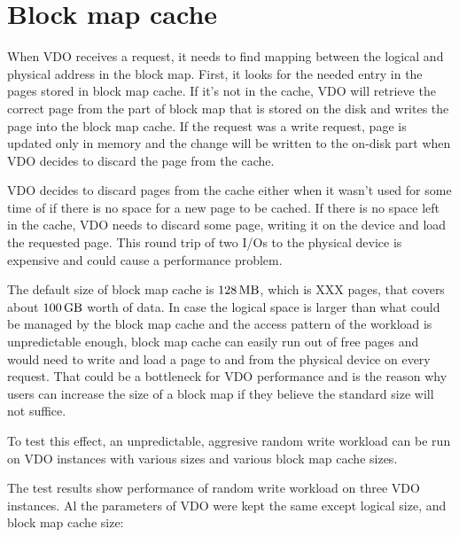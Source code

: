 \documentclass[
  color, %
  table, %
  lof,   %
  lot,   %
]{fithesis3}
\begin{document}
\section{Block map cache}

When VDO receives a request, it needs to find mapping between the logical and physical address in the block map. First, it looks for the needed entry in the pages stored in block map cache. If it's not in the cache, VDO will retrieve the correct page from the part of block map that is stored on the disk and writes the page into the block map cache. If the request was a write request, page is updated only in memory and the change will be written to the on-disk part when VDO decides to discard the page from the cache.

VDO decides to discard pages from the cache either when it wasn't used for some time of if there is no space for a new page to be cached. If there is no space left in the cache, VDO needs to discard some page, writing it on the device and load the requested page. This round trip of two I/Os to the physical device is expensive and could cause a performance problem.

The default size of block map cache is $\SI{128}{\mega\byte}$, which is XXX pages, that covers about $\SI{100}{\giga\byte}$ worth of data. In case the logical space is larger than what could be managed by the block map cache and the access pattern of the workload is unpredictable enough, block map cache can easily run out of free pages and would need to write and load a page to and from the physical device on every request. That could be a bottleneck for VDO performance and is the reason why users can increase the size of a block map if they believe the standard size will not suffice.

To test this effect, an unpredictable, aggresive random write workload can be run on VDO instances with various sizes and various block map cache sizes.

The test results show performance of random write workload on three VDO instances. Al the parameters of VDO were kept the same except logical size, and block map cache size:
\end{document}
